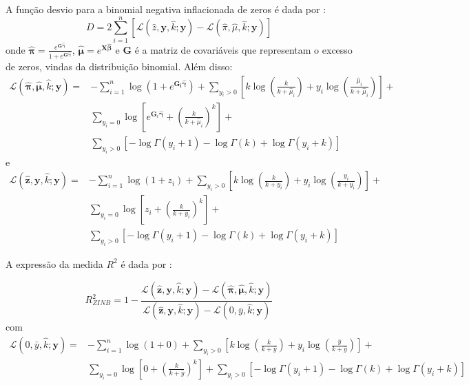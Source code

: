 \documentclass[12pt, a4paper, twoside]{report}
\numberwithin{equation}{section} %
\begin{document}

A função desvio para a binomial negativa inflacionada de zeros é dada por \citep{martin2016}:
\begin{equation}
    D = 2\sum_{i=1}^n[\mathcal{L}(\hat{z},\textbf{y},\hat{k};\textbf{y}) - \mathcal{L}(\hat{\pi},\hat{\mu},\hat{k};\textbf{y})]
\end{equation}
onde $\boldsymbol{\hat{\pi}}=\frac{e^{\boldsymbol{G\hat{\gamma}}}}{1+e^{\boldsymbol{G\hat{\gamma}}}}$, $\boldsymbol{\hat{\mu}}=e^{\boldsymbol{X\hat{\beta}}}$ e $\boldsymbol{G}$ é a matriz de covariáveis que representam o excesso de zeros, vindas da distribuição binomial. Além disso:
\begin{align}
\mathcal{L}(\hat{\boldsymbol{\pi}}, \hat{\boldsymbol{\mu}}, \hat{k} ; \boldsymbol{y})= & -\sum_{i=1}^n \log \left(1+e^{\boldsymbol{G}_{\boldsymbol{i}} \hat{\boldsymbol{\gamma}}}\right)+\sum_{y_i>0}\left[k \log \left(\frac{k}{k+\hat{\mu}_i}\right)+y_i \log \left(\frac{\hat{\mu}_i}{k+\hat{\mu}_i}\right)\right]+ \nonumber\\
& \sum_{y_i=0} \log \left[e^{\boldsymbol{G}_i \hat{\boldsymbol{\gamma}}}+\left(\frac{k}{k+\hat{\mu}_i}\right)^k\right]+ \nonumber \\
& \sum_{y_i>0}\left[-\log \Gamma\left(y_i+1\right)-\log \Gamma(k)+\log \Gamma\left(y_i+k\right)\right]
\end{align}
e
\begin{align}
\mathcal{L}(\hat{\boldsymbol{z}}, \boldsymbol{y}, \hat{k} ; \boldsymbol{y})= & -\sum_{i=1}^n \log \left(1+z_i\right)+\sum_{y_i>0}\left[k \log \left(\frac{k}{k+y_i}\right)+y_i \log \left(\frac{y_i}{k+y_i}\right)\right]+ \nonumber \\
& \sum_{y_i=0} \log \left[z_i+\left(\frac{k}{k+y_i}\right)^k\right]+ \\
& \sum_{y_i>0}\left[-\log \Gamma\left(y_i+1\right)-\log \Gamma(k)+\log \Gamma\left(y_i+k\right)\right] \nonumber
\end{align}

A expressão da medida $R^2$ é dada por \citep{martin2016}:

\begin{equation}
    R_{Z I N B}^2=1-\frac{\mathcal{L}(\hat{\boldsymbol{z}}, \boldsymbol{y}, \hat{k} ; \boldsymbol{y})-\mathcal{L}(\hat{\boldsymbol{\pi}}, \hat{\boldsymbol{\mu}}, \hat{k} ; \boldsymbol{y})}{\mathcal{L}(\hat{\boldsymbol{z}}, \boldsymbol{y}, \hat{k} ; \boldsymbol{y})-\mathcal{L}(0, \bar{y}, \hat{k} ; \boldsymbol{y})}
\end{equation}
com
\begin{equation}
    \begin{aligned}
\mathcal{L}(0, \bar{y}, \hat{k} ; \boldsymbol{y})= & -\sum_{i=1}^n \log (1+0)+\sum_{y_i>0}\left[k \log \left(\frac{k}{k+\bar{y}}\right)+y_i \log \left(\frac{\bar{y}}{k+\bar{y}}\right)\right]+ \\
& \sum_{y_i=0} \log \left[0+\left(\frac{k}{k+\bar{y}}\right)^k\right]+\sum_{y_i>0}\left[-\log \Gamma\left(y_i+1\right)-\log \Gamma(k)+\log \Gamma\left(y_i+k\right)\right]
\end{aligned}
\end{equation}
\end{document}
